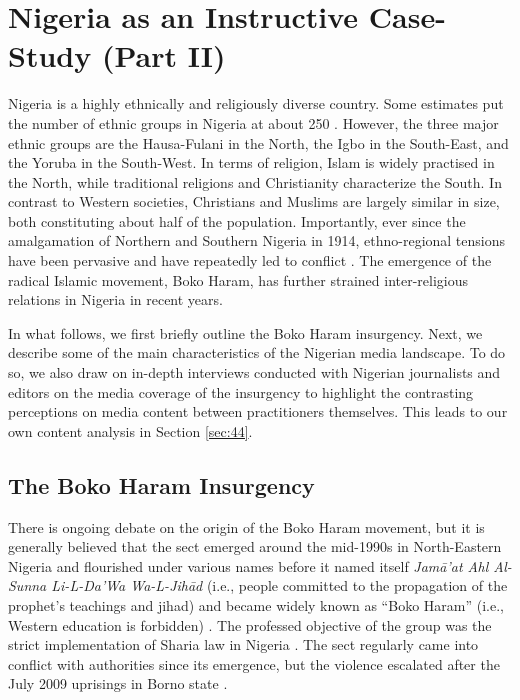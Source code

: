 \section{Nigeria as an Instructive Case-Study (Part II)}
\label{sec:43}
Nigeria is a highly ethnically and religiously diverse country. Some estimates put the number of ethnic groups in Nigeria at about 250 \citep[][pp. 5-6]{Graf1988}. However, the three major ethnic groups are the Hausa-Fulani in the North, the Igbo in the South-East, and the Yoruba in the South-West. In terms of religion, Islam is widely practised in the North, while traditional religions and Christianity characterize the South. In contrast to Western societies, Christians and Muslims are largely similar in size, both constituting about half of the population. Importantly, ever since the amalgamation of Northern and Southern Nigeria in 1914, ethno-regional tensions have been pervasive and have repeatedly led to conflict \citep{Suberu2001}. The emergence of the radical Islamic movement, Boko Haram, has further strained inter-religious relations in Nigeria in recent years. 


In what follows, we first briefly outline the Boko Haram insurgency. Next, we describe some of the main characteristics of the Nigerian media landscape. To do so, we also draw on in-depth interviews conducted with Nigerian journalists and editors on the media coverage of the insurgency to highlight the contrasting perceptions on media content between practitioners themselves. This leads to our own content analysis in Section \ref{sec:44}.


\subsection{The Boko Haram Insurgency}
\label{sec:431}
There is ongoing debate on the origin of the Boko Haram movement, but it is generally believed that the sect emerged around the mid-1990s in North-Eastern Nigeria and flourished under various names before it named itself \textit{Jamā'at Ahl Al-Sunna Li-L-Da'Wa Wa-L-Jihād} (i.e., people committed to the propagation of the prophet's teachings and jihad) and became widely known as ``Boko Haram'' (i.e., Western education is forbidden) \citep{Mustapha2014b}. The professed objective of the group was the strict implementation of Sharia law in Nigeria \citep{Onuoha2015}. The sect regularly came into conflict with authorities since its emergence, but the violence escalated after the July 2009 uprisings in Borno state \citep{Mustapha2014b}.


